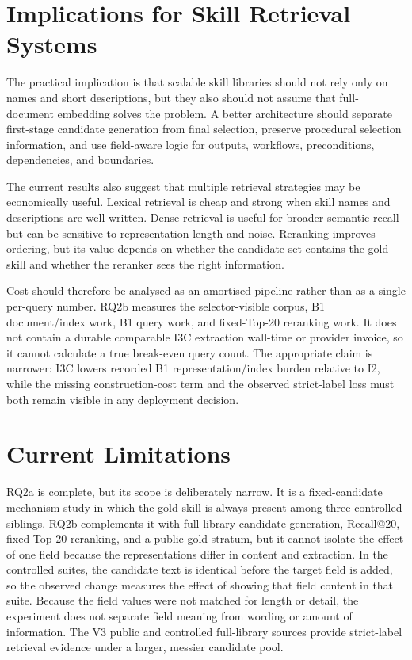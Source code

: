 \section{Implications for Skill Retrieval Systems}

The practical implication is that scalable skill libraries should not rely only on names and short descriptions, but they also should not assume that full-document embedding solves the problem. A better architecture should separate first-stage candidate generation from final selection, preserve procedural selection information, and use field-aware logic for outputs, workflows, preconditions, dependencies, and boundaries.

The current results also suggest that multiple retrieval strategies may be economically useful. Lexical retrieval is cheap and strong when skill names and descriptions are well written. Dense retrieval is useful for broader semantic recall but can be sensitive to representation length and noise. Reranking improves ordering, but its value depends on whether the candidate set contains the gold skill and whether the reranker sees the right information.

Cost should therefore be analysed as an amortised pipeline rather than as a single per-query number. RQ2b measures the selector-visible corpus, B1 document/index work, B1 query work, and fixed-Top-20 reranking work. It does not contain a durable comparable I3C extraction wall-time or provider invoice, so it cannot calculate a true break-even query count. The appropriate claim is narrower: I3C lowers recorded B1 representation/index burden relative to I2, while the missing construction-cost term and the observed strict-label loss must both remain visible in any deployment decision.

\section{Current Limitations}

RQ2a is complete, but its scope is deliberately narrow. It is a fixed-candidate mechanism study in which the gold skill is always present among three controlled siblings. RQ2b complements it with full-library candidate generation, Recall@20, fixed-Top-20 reranking, and a public-gold stratum, but it cannot isolate the effect of one field because the representations differ in content and extraction. In the controlled suites, the candidate text is identical before the target field is added, so the observed change measures the effect of showing that field content in that suite. Because the field values were not matched for length or detail, the experiment does not separate field meaning from wording or amount of information. The V3 public and controlled full-library sources provide strict-label retrieval evidence under a larger, messier candidate pool.

